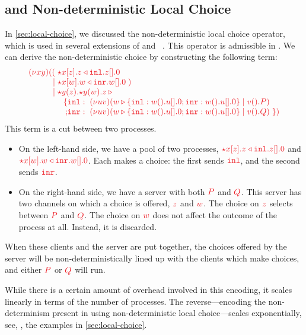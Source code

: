 \documentclass[envcountsame,UKenglish]{llncs}
\begin{document}
\subsection{\nodcap and Non-deterministic Local Choice}\label{sec:nc-local-choice}
In \cref{sec:local-choice}, we discussed the non-deterministic local choice operator, which is used in several extensions of \piDILL and \cp~\cite{atkey2016,caires2014,caires2017}. This operator is admissible in \nodcap. We can derive the non-deterministic choice  by constructing the following term:
\[%
  \arraycolsep=0pt
  \tm{
  \begin{array}{lrlrl}
    \piNew{x}{y}{}
    &((  & \; \ncCnt{x}{z}{\cpInl{z}{\cpHalt{z}}} \\
    &\mid& \; \ncCnt{x}{w}{\cpInr{w}{\cpHalt{w}}} \; )\\
    &\mid& \; \ncSrv{y}{z}{\ncSrv{y}{w}{z\:{\triangleright}}}\\
    &    & \quad
           \begin{array}{rl}
             \{ & \texttt{inl}: \; \piNew{u}{v}{(\piPar{\cpCase{w}{\cpWait{w}{\cpHalt{u}}}{
                  \cpWait{w}{\cpHalt{u}}}}{\cpWait{v}{P}})}
             \\
             ; & \texttt{inr}: \; \piNew{u}{v}{(\piPar{\cpCase{w}{\cpWait{w}{\cpHalt{u}}}{
                 \cpWait{w}{\cpHalt{u}}}}{\cpWait{v}{Q}})} \; \})
           \end{array}
  \end{array}
  }
\]
This term is a cut between two processes.
\begin{itemize}
\item
  On the left-hand side, we have a pool of two processes, $\tm{\ncCnt{x}{z}{\cpInl{z}{\cpHalt{z}}}}$ and $\tm{\ncCnt{x}{w}{\cpInr{w}{\cpHalt{w}}}}$. Each makes a choice: the first sends $\tm{\texttt{inl}}$, and the second sends $\tm{\texttt{inr}}$. 
\item
  On the right-hand side, we have a server with both $\tm{P}$ and $\tm{Q}$. This server has two channels on which a choice is offered, $\tm{z}$ and $\tm{w}$. The choice on $\tm{z}$ selects between $\tm{P}$ and $\tm{Q}$. The choice on $\tm{w}$ does not affect the outcome of the process at all. Instead, it is discarded.
\end{itemize}
When these clients and the server are put together, the choices offered by the server will be non-deterministically lined up with the clients which make choices, and either $\tm{P}$ or $\tm{Q}$ will run.

While there is a certain amount of overhead involved in this encoding, it scales linearly in terms of the number of processes. The reverse---encoding the non-determinism present in \nodcap using non-deterministic local choice---scales exponentially, see, \eg, the examples in \cref{sec:local-choice}.
\end{document}
